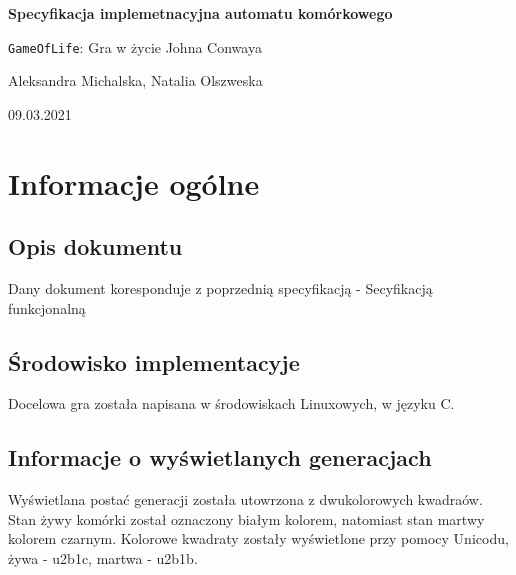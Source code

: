 \documentclass[a4paper]{article}
\begin{document}
\begin{titlepage}
	\begin{center}
		\vspace*{5cm}

	        \Huge
        	\textbf{Specyfikacja implemetnacyjna automatu kom\'orkowego}

        	\vspace{1cm}
	        \Huge
        	\texttt{GameOfLife}: Gra w \.zycie Johna Conwaya

    		\vspace{1.5cm}

	        \large
		Aleksandra Michalska, Natalia Olszweska

        	\vfill

	        \vspace{3cm}


		\large 09.03.2021
	\end{center}
\end{titlepage}



\section{Informacje og\'olne}

\subsection{Opis dokumentu}

\quad Dany dokument koresponduje z poprzedni\k{a} specyfikacj\k{a} - Secyfikacj\k{a} funkcjonaln\k{a}

\subsection{\'Srodowisko implementacyje}
\quad Docelowa gra zosta\l{}a napisana w \'srodowiskach Linuxowych, w j\k{e}zyku C. 


\subsection{Informacje o wy\'swietlanych generacjach}

\quad Wy\'swietlana posta\'c generacji zosta\l{}a utowrzona z dwukolorowych kwadra\'ow. 
Stan \.zywy kom\'orki zosta\l{} oznaczony bia\l{}ym kolorem, natomiast stan martwy kolorem czarnym. 
Kolorowe kwadraty zosta\l{}y wy\'swietlone przy pomocy Unicodu, \.zywa - u2b1c, martwa - u2b1b. 
\end{document}
